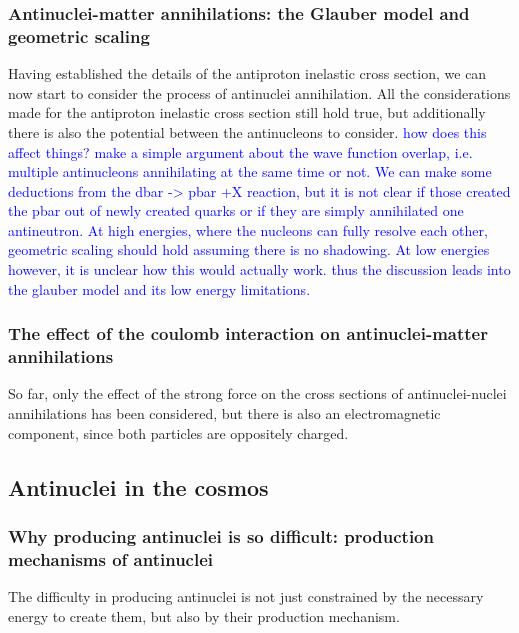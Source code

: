 \subsubsection{Antinuclei-matter annihilations: the Glauber model and geometric scaling}\label{sec:IntroGlauber}
Having established the details of the antiproton inelastic cross section, we can now start to consider the process of antinuclei annihilation. All the considerations made for the antiproton inelastic cross section still hold true, but additionally there is also the potential between the antinucleons to consider. \textcolor{blue}{how does this affect things? make a simple argument about the wave function overlap, i.e. multiple antinucleons annihilating at the same time or not. We can make some deductions from the dbar -> pbar +X reaction, but it is not clear if those created the pbar out of newly created quarks or if they are simply annihilated one antineutron. At high energies, where the nucleons can fully resolve each other, geometric scaling should hold assuming there is no shadowing. At low energies however, it is unclear how this would actually work. thus the discussion leads into the glauber model and its low energy limitations.}

\subsubsection{The effect of the coulomb interaction on antinuclei-matter annihilations}
So far, only the effect of the strong force on the cross sections of antinuclei-nuclei annihilations has been considered, but there is also an electromagnetic component, since both particles are oppositely charged. 


%
%
\subsection{Antinuclei in the cosmos}

\subsubsection{ Why producing antinuclei is so difficult: production mechanisms of antinuclei}\label{sec:IntroProductionAntinuclei}
The difficulty in producing antinuclei is not just constrained by the necessary energy to create them, but also by their production mechanism. \\


